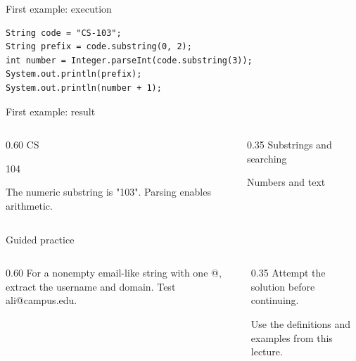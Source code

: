 \documentclass[10pt,aspectratio=169]{beamer}
\begin{document}
\begin{frame}[fragile,t]{First example: execution}
\begin{lstlisting}
String code = "CS-103";
String prefix = code.substring(0, 2);
int number = Integer.parseInt(code.substring(3));
System.out.println(prefix);
System.out.println(number + 1);
\end{lstlisting}
\end{frame}

\begin{frame}[fragile,t]{First example: result}
\begin{columns}[T,onlytextwidth]\begin{column}{0.60\textwidth}
CS\par 104\par The numeric substring is "103". Parsing enables arithmetic.
\end{column}\begin{column}{0.35\textwidth}\small
Substrings and searching

Numbers and text
\end{column}\end{columns}
\end{frame}

\begin{frame}[fragile,t]{Guided practice}
\begin{columns}[T,onlytextwidth]\begin{column}{0.60\textwidth}
For a nonempty email-like string with one @, extract the username and domain. Test ali@campus.edu.
\end{column}\begin{column}{0.35\textwidth}\small
Attempt the solution before continuing.

Use the definitions and examples from this lecture.
\end{column}\end{columns}
\end{frame}
\end{document}
